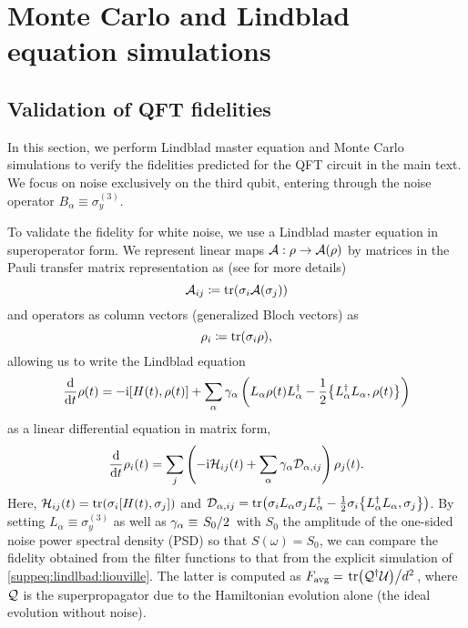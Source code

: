 \chapter{Monte Carlo and Lindblad equation simulations}
\section{Validation of QFT fidelities}
In this section, we perform Lindblad master equation and Monte Carlo simulations to verify the fidelities predicted for the QFT circuit in the main text. We focus on noise exclusively on the third qubit, entering through the noise operator $B_\alpha\equiv\sigma_y^{(3)}$. 

To validate the fidelity for white noise, we use a Lindblad master equation \cite{Lindblad1976,Gorini1976} in superoperator form. We represent linear maps $\mathcal{A}: \rho\rightarrow\mathcal{A}(\rho)$ by matrices in the Pauli transfer matrix representation as (see  for more details)
\begin{equation}
    \mathcal{A}_{ij} \coloneqq \tr(\sigma_i\mathcal{A}(\sigma_j))
\end{equation}
and operators as column vectors (\ie generalized Bloch vectors) as
\begin{equation}
    \rho_i \coloneqq \tr(\sigma_i\rho),
\end{equation}
allowing us to write the Lindblad equation
\begin{equation}
    \dv{t}\rho(t) = -\i\comm{H(t)}{\rho(t)} + \sum_\alpha \gamma_\alpha\left(L_\alpha\rho(t) L_\alpha\adjoint - \frac{1}{2}\acomm{L_\alpha\adjoint L_\alpha}{\rho(t)}\right)
\end{equation}
as a linear differential equation in matrix form,
\begin{equation}\label{suppeq:lindlbad:liouville}
    \dv{t}\rho_i(t) = \sum_j\left(-\mathrm{i}\mathcal{H}_{ij}(t)+ \sum_\alpha \gamma_\alpha \mathcal{D}_{\alpha, ij}\right)\rho_j(t).
\end{equation}
Here, $\mc{H}_{ij}(t) = \tr(\sigma_i\comm{H(t)}{\sigma_j})$ and $\mc{D}_{\alpha, ij} = \tr(\sigma_i L_\alpha\sigma_j L_\alpha\adjoint - \frac{1}{2}\sigma_i \acomm{L_\alpha\adjoint L_\alpha}{\sigma_j})$. By setting $L_\alpha\equiv\sigma_y^{(3)}$ as well as $\gamma_\alpha\equiv\flatfrac{S_0}{2}$ with $S_0$ the amplitude of the one-sided noise power spectral density (PSD) so that $S(\omega) = S_0$, we can compare the fidelity obtained from the filter functions to that from the explicit simulation of \cref{suppeq:lindlbad:liouville}. The latter is computed as $\avgfid = \flatfrac{\tr(\mc{Q}\adjoint\mc{U})}{d^2}$, where $\mathcal{Q}$ is the superpropagator due to the Hamiltonian evolution alone (\ie the ideal evolution without noise).

